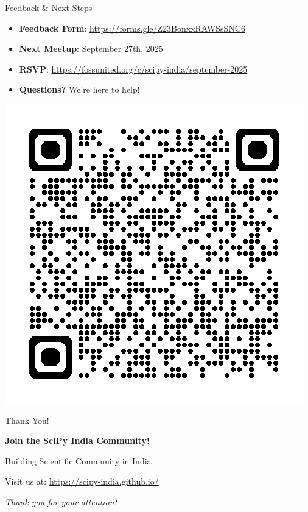 \documentclass[16pt,t]{beamer}
\begin{document}
\begin{frame}{Feedback \& Next Steps}
\begin{itemize}
    \item \textbf{Feedback Form}: \url{https://forms.gle/Z23BonxxRAWSsSNC6}
    \item \textbf{Next Meetup}: September 27th, 2025
    \item \textbf{RSVP}: \url{https://fossunited.org/c/scipy-india/september-2025}
    \item \textbf{Questions?} We're here to help!
\end{itemize}

\begin{center}
    \includegraphics[scale=0.3]{Figures/qr-code.png}
\end{center}
\end{frame}

\begin{frame}{Thank You!}
\begin{center}
\Large
\textbf{Join the SciPy India Community!}

\vspace{1cm}

\large
Building Scientific Community in India

\vspace{1cm}

\normalsize
Visit us at: \url{https://scipy-india.github.io/}

\vspace{0.5cm}

\vspace{1cm}

\textit{Thank you for your attention!}
\end{center}
\end{frame}



% 
\end{document}
